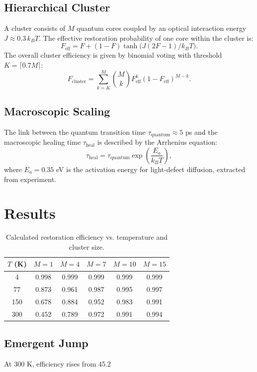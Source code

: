 \documentclass[12pt]{article}
\begin{document}
\subsection{Hierarchical Cluster}
A cluster consists of $M$ quantum cores coupled by an optical interaction energy $J \approx 0.3\,k_B T$. The effective restoration probability of one core within the cluster is:
\begin{equation}
F_{\text{eff}} = F + (1-F)\tanh\bigl(J(2F-1)/k_B T\bigr).
\end{equation}
The overall cluster efficiency is given by binomial voting with threshold $K = \lceil 0.7M \rceil$:
\begin{equation}
F_{\text{cluster}} = \sum_{k=K}^{M} \binom{M}{k} F_{\text{eff}}^k (1-F_{\text{eff}})^{M-k}.
\end{equation}

\subsection{Macroscopic Scaling}
The link between the quantum transition time $\tau_{\text{quantum}} \approx 5$ ps and the macroscopic healing time $\tau_{\text{heal}}$ is described by the Arrhenius equation:
\begin{equation}
\tau_{\text{heal}} = \tau_{\text{quantum}} \exp\!\left(\frac{E_a}{k_B T}\right),
\end{equation}
where $E_a = 0.35$ eV is the activation energy for light-defect diffusion, extracted from experiment.

\section{Results}
\begin{table}[h]
\centering
\caption{Calculated restoration efficiency vs. temperature and cluster size.}
\begin{tabular}{c|ccccc}
\hline
$T$ (K) & $M=1$ & $M=4$ & $M=7$ & $M=10$ & $M=15$ \\
\hline
4   & 0.998 & 0.999 & 0.999 & 0.999 & 0.999 \\
77  & 0.873 & 0.961 & 0.987 & 0.995 & 0.997 \\
150 & 0.678 & 0.884 & 0.952 & 0.983 & 0.991 \\
300 & 0.452 & 0.789 & 0.972 & 0.991 & 0.994 \\
\hline
\end{tabular}
\end{table}

\subsection{Emergent Jump}
At 300 K, efficiency rises from 45.2%
\end{document}
